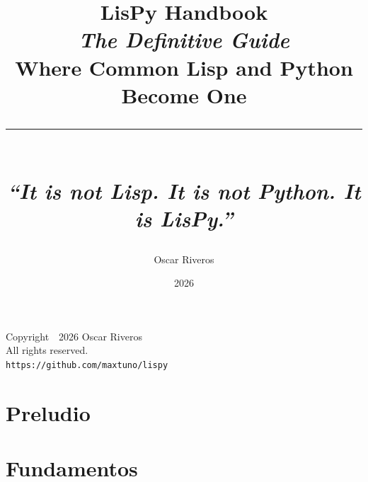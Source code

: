 \documentclass{lispy-book}
\begin{document}
\frontmatter

\title{%
  {\Huge\bfseries\color{lispblue} LisPy Handbook}\\[6pt]
  {\Large\itshape The Definitive Guide}\\[4pt]
  {\large Where Common Lisp and Python Become One}\\[12pt]
  \rule{0.5\textwidth}{0.5pt}\\[8pt]
  {\small\itshape ``It is not Lisp. It is not Python. It is LisPy.''}
}
\author{Oscar Riveros}
\date{2026}

\maketitle
\thispagestyle{empty}

\clearpage

\vspace*{\fill}
\begin{center}
  \small
  Copyright~\textcopyright~2026 Oscar Riveros\\[6pt]
  All rights reserved.\\[12pt]
  \texttt{https://github.com/maxtuno/lispy}
\end{center}
\vspace*{\fill}

\clearpage

\tableofcontents
\clearpage

\listoffigures
\clearpage

\listoftables
\clearpage

\mainmatter

\part{Preludio}
\label{part:preludio}






\part{Fundamentos}
\label{part:fundamentos}









\end{document}
